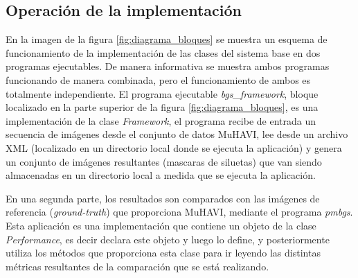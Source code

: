 \subsection{Operación de la implementación}
En la imagen de la figura \ref{fig:diagrama_bloques} se muestra un esquema de funcionamiento de la implementación de las clases del sistema base en dos programas ejecutables. De manera informativa se muestra ambos programas funcionando de manera combinada, pero el funcionamiento de ambos es totalmente independiente. El programa ejecutable \textit{bgs\_framework}, bloque localizado en la parte superior de la figura \ref{fig:diagrama_bloques}, es una implementación de la clase \textit{Framework}, el programa recibe de entrada un secuencia de imágenes desde el conjunto de datos MuHAVI, lee desde un archivo XML (localizado en un directorio local donde se ejecuta la aplicación) y genera un conjunto de imágenes resultantes (mascaras de siluetas) que van siendo almacenadas en un directorio local a medida que se ejecuta la aplicación.


En una segunda parte, los resultados son comparados con las imágenes de referencia (\textit{ground-truth}) que proporciona MuHAVI, mediante el programa \textit{pmbgs}. Esta aplicación es una implementación que contiene un objeto de la clase \textit{Performance}, es decir declara este objeto y luego lo define, y posteriormente utiliza los métodos que proporciona esta clase para ir leyendo las distintas métricas resultantes de la comparación que se está realizando.

